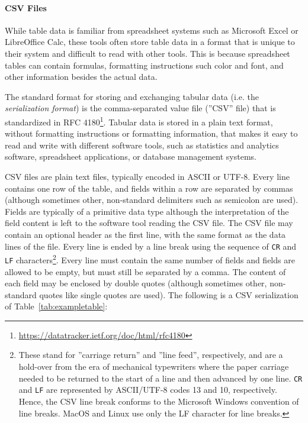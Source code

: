 \paragraph*{CSV Files}

While table data is familiar from spreadsheet systems such as Microsoft Excel or LibreOffice Calc, these tools often store table data in a format that is unique to their system and difficult to read with other tools. This is because spreadsheet tables can contain formulas, formatting instructions such color and font, and other information besides the actual data.

The standard format for storing and exchanging tabular data (i.e. the \emph{serialization format}) is the comma-separated value file (''CSV'' file) that is standardized in RFC 4180\footnote{\url{https://datatracker.ietf.org/doc/html/rfc4180}}. Tabular data is stored in a plain text format, without formatting instructions or formatting information, that makes it easy to read and write with different software tools, such as statistics and analytics software, spreadsheet applications, or database management systems. 

CSV files are plain text files, typically encoded in ASCII or UTF-8. Every line contains one row of the table, and fields within a row are separated by commas (although sometimes other, non-standard delimiters such as semicolon are used). Fields are typically of a primitive data type although the interpretation of the field content is left to the software tool reading the CSV file. The CSV file may contain an optional header as the first line, with the same format as the data lines of the file. Every line is ended by a line break using the sequence of  \texttt{CR} and \texttt{LF} characters\footnote{These stand for ''carriage return'' and ''line feed'', respectively, and are a hold-over from the era of mechanical typewriters where the paper carriage needed to be returned to the start of a line and then advanced by one line. \texttt{CR} and \texttt{LF} are represented by ASCII/UTF-8 codes 13 and 10, respectively. Hence, the CSV line break conforms to the Microsoft Windows convention of line breaks. MacOS and Linux use only the LF character for line breaks.}. Every line must contain the same number of fields and fields are allowed to be empty, but must still be separated by a comma. The content of each field may be enclosed by double quotes (although sometimes other, non-standard quotes like single quotes are used). The following is a CSV serialization of Table~\ref{tab:exampletable}:

